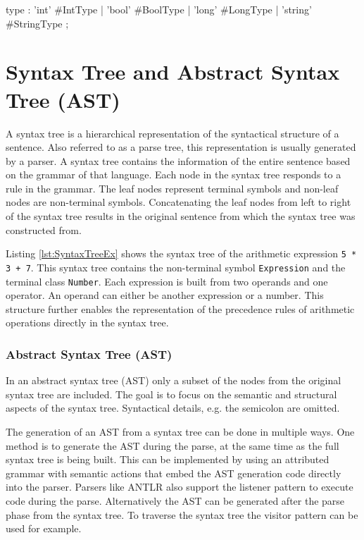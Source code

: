 \begin{GenericCode}[float,numbers=none,caption=Example rule using alternative labels for the rule alternatives., label=lst:ANTLRRuleAlt]
  type
      : 'int'     #IntType
      | 'bool'    #BoolType
      | 'long'    #LongType
      | 'string'  #StringType
      ;
  \end{GenericCode}

\section{Syntax Tree and Abstract Syntax Tree (AST)}

A syntax tree is a hierarchical representation of the syntactical structure of a sentence. Also referred to as a parse tree, this representation is usually generated by a parser. A syntax tree contains the information of the entire sentence based on the grammar of that language. Each node in the syntax tree responds to a rule in the grammar. The leaf nodes represent terminal symbols and non-leaf nodes are non-terminal symbols. Concatenating the leaf nodes from left to right of the syntax tree results in the original sentence from which the syntax tree was constructed from. 

Listing \ref{lst:SyntaxTreeEx} shows the syntax tree of the arithmetic expression \texttt{5 * 3 + 7}. This syntax tree contains the non-terminal symbol \texttt{Expression} and the terminal class \texttt{Number}. Each expression is built from two operands and one operator. An operand can either be another expression or a number. This structure further enables the representation of the precedence rules of arithmetic operations directly in the syntax tree.  

\subsubsection{Abstract Syntax Tree (AST)}
In an abstract syntax tree (AST) only a subset of the nodes from the original syntax tree are included. The goal is to focus on the semantic and structural aspects of the syntax tree. Syntactical details, e.g. the semicolon are omitted. 

The generation of an AST from a syntax tree can be done in multiple ways. One method is to generate the AST during the parse, at the same time as the full syntax tree is being built. This can be implemented by using an attributed grammar with semantic actions that embed the AST generation code directly into the parser. Parsers like ANTLR also support the listener pattern to execute code during the parse. Alternatively the AST can be generated after the parse phase from the syntax tree. To traverse the syntax tree the visitor pattern can be used for example.  

